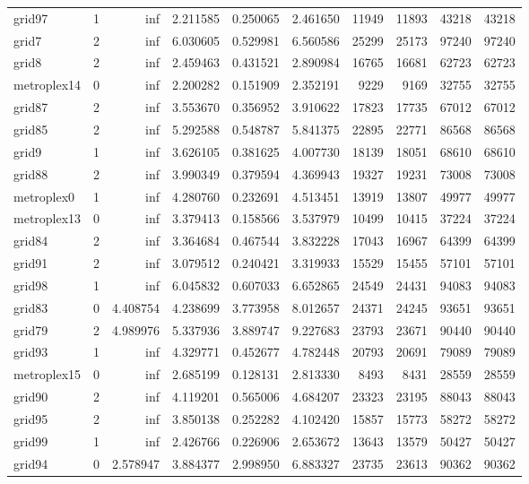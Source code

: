 \begin{longtable}{|l|r|r|r|r|r|r|r|r|r|}
grid97 & 1 & inf & 2.211585 & 0.250065 & 2.461650 & 11949 & 11893 & 43218 & 43218 \\
grid7 & 2 & inf & 6.030605 & 0.529981 & 6.560586 & 25299 & 25173 & 97240 & 97240 \\
grid8 & 2 & inf & 2.459463 & 0.431521 & 2.890984 & 16765 & 16681 & 62723 & 62723 \\
metroplex14 & 0 & inf & 2.200282 & 0.151909 & 2.352191 & 9229 & 9169 & 32755 & 32755 \\
grid87 & 2 & inf & 3.553670 & 0.356952 & 3.910622 & 17823 & 17735 & 67012 & 67012 \\
grid85 & 2 & inf & 5.292588 & 0.548787 & 5.841375 & 22895 & 22771 & 86568 & 86568 \\
grid9 & 1 & inf & 3.626105 & 0.381625 & 4.007730 & 18139 & 18051 & 68610 & 68610 \\
grid88 & 2 & inf & 3.990349 & 0.379594 & 4.369943 & 19327 & 19231 & 73008 & 73008 \\
metroplex0 & 1 & inf & 4.280760 & 0.232691 & 4.513451 & 13919 & 13807 & 49977 & 49977 \\
metroplex13 & 0 & inf & 3.379413 & 0.158566 & 3.537979 & 10499 & 10415 & 37224 & 37224 \\
grid84 & 2 & inf & 3.364684 & 0.467544 & 3.832228 & 17043 & 16967 & 64399 & 64399 \\
grid91 & 2 & inf & 3.079512 & 0.240421 & 3.319933 & 15529 & 15455 & 57101 & 57101 \\
grid98 & 1 & inf & 6.045832 & 0.607033 & 6.652865 & 24549 & 24431 & 94083 & 94083 \\
grid83 & 0 & 4.408754 & 4.238699 & 3.773958 & 8.012657 & 24371 & 24245 & 93651 & 93651 \\
grid79 & 2 & 4.989976 & 5.337936 & 3.889747 & 9.227683 & 23793 & 23671 & 90440 & 90440 \\
grid93 & 1 & inf & 4.329771 & 0.452677 & 4.782448 & 20793 & 20691 & 79089 & 79089 \\
metroplex15 & 0 & inf & 2.685199 & 0.128131 & 2.813330 & 8493 & 8431 & 28559 & 28559 \\
grid90 & 2 & inf & 4.119201 & 0.565006 & 4.684207 & 23323 & 23195 & 88043 & 88043 \\
grid95 & 2 & inf & 3.850138 & 0.252282 & 4.102420 & 15857 & 15773 & 58272 & 58272 \\
grid99 & 1 & inf & 2.426766 & 0.226906 & 2.653672 & 13643 & 13579 & 50427 & 50427 \\
grid94 & 0 & 2.578947 & 3.884377 & 2.998950 & 6.883327 & 23735 & 23613 & 90362 & 90362 \\

\end{longtable}
